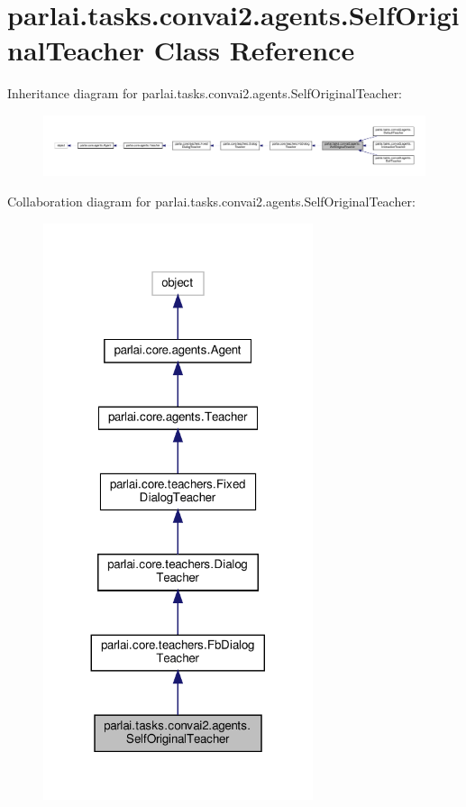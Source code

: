 \hypertarget{classparlai_1_1tasks_1_1convai2_1_1agents_1_1SelfOriginalTeacher}{}\section{parlai.\+tasks.\+convai2.\+agents.\+Self\+Original\+Teacher Class Reference}
\label{classparlai_1_1tasks_1_1convai2_1_1agents_1_1SelfOriginalTeacher}


Inheritance diagram for parlai.\+tasks.\+convai2.\+agents.\+Self\+Original\+Teacher\+:
\nopagebreak
\begin{figure}[H]
\begin{center}
\leavevmode
\includegraphics[width=350pt]{classparlai_1_1tasks_1_1convai2_1_1agents_1_1SelfOriginalTeacher__inherit__graph}
\end{center}
\end{figure}


Collaboration diagram for parlai.\+tasks.\+convai2.\+agents.\+Self\+Original\+Teacher\+:
\nopagebreak
\begin{figure}[H]
\begin{center}
\leavevmode
\includegraphics[width=224pt]{classparlai_1_1tasks_1_1convai2_1_1agents_1_1SelfOriginalTeacher__coll__graph}
\end{center}
\end{figure}

